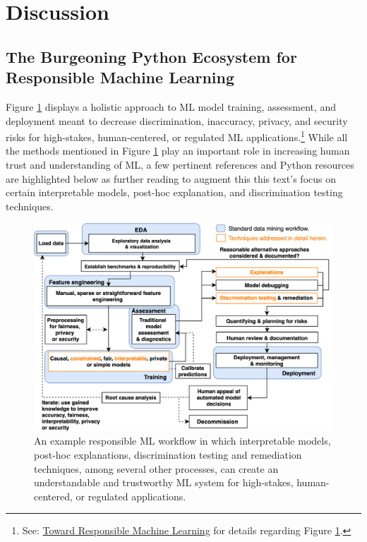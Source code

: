 \documentclass[information,article,submit,moreauthors,pdftex]{definitions/mdpi}
\begin{document}
\section{Discussion}\label{sec:disc}

\subsection{The Burgeoning Python Ecosystem for Responsible Machine Learning}

Figure \ref{fig:blueprint} displays a holistic approach to ML model training, assessment, and deployment meant to decrease discrimination, inaccuracy, privacy, and security risks for high-stakes, human-centered, or regulated ML applications.\footnote{See: \href{https://github.com/jphall663/hc_ml}{Toward Responsible Machine Learning} for details regarding Figure \ref{fig:blueprint}.} While all the methods mentioned in Figure \ref{fig:blueprint} play an important role in increasing human trust and understanding of ML, a few pertinent references and Python resources are highlighted below as further reading to augment this this text's focus on certain interpretable models, post-hoc explanation, and discrimination testing techniques.   

\begin{figure}[H]
	\centering
	\includegraphics[width=12cm]{img/blueprint.png}
	\caption{An example responsible ML workflow in which interpretable models, post-hoc explanations, discrimination testing and remediation techniques, among several other processes, can create an understandable and trustworthy ML system for high-stakes, human-centered, or regulated applications.}
	\label{fig:blueprint}
\end{figure} 
\end{document}
